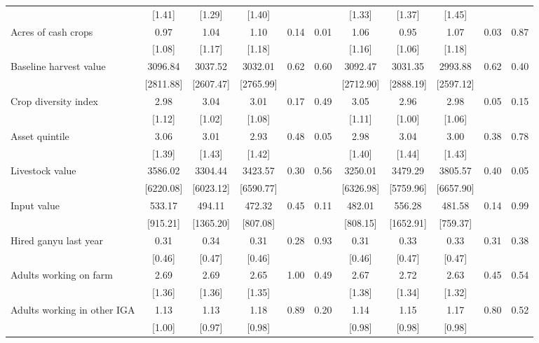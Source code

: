 \begin{tabular}{l cc cc cc cc cc}
 & [1.41] & [1.29] & [1.40] & & & [1.33] & [1.37] & [1.45] & & \\ 
Acres of cash crops & 0.97     & 1.04     & 1.10     & 0.14 & 0.01 & 1.06     & 0.95     & 1.07     & 0.03 & 0.87 \\ 
 & [1.08] & [1.17] & [1.18] & & & [1.16] & [1.06] & [1.18] & & \\ 
Baseline harvest value & 3096.84  & 3037.52  & 3032.01  & 0.62 & 0.60 & 3092.47  & 3031.35  & 2993.88  & 0.62 & 0.40 \\ 
 & [2811.88] & [2607.47] & [2765.99] & & & [2712.90] & [2888.19] & [2597.12] & & \\ 
Crop diversity index & 2.98     & 3.04     & 3.01     & 0.17 & 0.49 & 3.05     & 2.96     & 2.98     & 0.05 & 0.15 \\ 
 & [1.12] & [1.02] & [1.08] & & & [1.11] & [1.00] & [1.06] & & \\ 
Asset quintile & 3.06     & 3.01     & 2.93     & 0.48 & 0.05 & 2.98     & 3.04     & 3.00     & 0.38 & 0.78 \\ 
 & [1.39] & [1.43] & [1.42] & & & [1.40] & [1.44] & [1.43] & & \\ 
Livestock value & 3586.02  & 3304.44  & 3423.57  & 0.30 & 0.56 & 3250.01  & 3479.29  & 3805.57  & 0.40 & 0.05 \\ 
 & [6220.08] & [6023.12] & [6590.77] & & & [6326.98] & [5759.96] & [6657.90] & & \\ 
Input value & 533.17   & 494.11   & 472.32   & 0.45 & 0.11 & 482.01   & 556.28   & 481.58   & 0.14 & 0.99 \\ 
 & [915.21] & [1365.20] & [807.08] & & & [808.15] & [1652.91] & [759.37] & & \\ 
Hired ganyu last year & 0.31     & 0.34     & 0.31     & 0.28 & 0.93 & 0.31     & 0.33     & 0.33     & 0.31 & 0.38 \\ 
 & [0.46] & [0.47] & [0.46] & & & [0.46] & [0.47] & [0.47] & & \\ 
Adults working on farm & 2.69     & 2.69     & 2.65     & 1.00 & 0.49 & 2.67     & 2.72     & 2.63     & 0.45 & 0.54 \\ 
 & [1.36] & [1.36] & [1.35] & & & [1.38] & [1.34] & [1.32] & & \\ 
Adults working in other IGA & 1.13     & 1.13     & 1.18     & 0.89 & 0.20 & 1.14     & 1.15     & 1.17     & 0.80 & 0.52 \\ 
 & [1.00] & [0.97] & [0.98] & & & [0.98] & [0.98] & [0.98] & & \\ 
\hline
\end{tabular}
